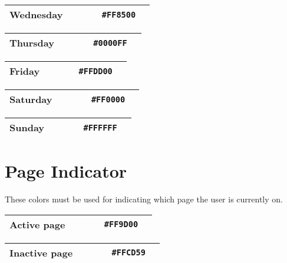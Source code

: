 \begin{table}[!htbp]
	\begin{tabularx}{\textwidth}{X r c r c}
		Wednesday 
		& ~ & ~
		& \texttt{\#FF8500} & \cellcolor[HTML]{FF8500}\phantom{--} \\ \hline
	\end{tabularx}
\end{table}

\begin{table}[!htbp]
	\begin{tabularx}{\textwidth}{X r c r c}
		Thursday 
		& ~ & ~
		& \texttt{\#0000FF} & \cellcolor[HTML]{0000FF}\phantom{--} \\ \hline
	\end{tabularx}
\end{table}

\begin{table}[!htbp]
	\begin{tabularx}{\textwidth}{X r c r c}
		Friday 
		& ~ & ~
		& \texttt{\#FFDD00} & \cellcolor[HTML]{FFDD00}\phantom{--} \\ \hline
	\end{tabularx}
\end{table}

\begin{table}[!htbp]
	\begin{tabularx}{\textwidth}{X r c r c}
		Saturday 
		& ~ & ~
		& \texttt{\#FF0000} & \cellcolor[HTML]{FF0000}\phantom{--} \\ \hline
	\end{tabularx}
\end{table}

\begin{table}[!htbp]
	\begin{tabularx}{\textwidth}{X r c r c}
		Sunday 
		& ~ & ~
		& \texttt{\#FFFFFF} & \cellcolor[HTML]{FFFFFF}\phantom{--} \\ \hline
	\end{tabularx}
\end{table}

\section{Page Indicator}
These colors must be used for indicating which page the user is currently on.

\begin{table}[!htbp]
	\begin{tabularx}{\textwidth}{X r c r c}
		Active page
		& ~ & ~
		& \texttt{\#FF9D00} & \cellcolor[HTML]{FF9D00}\phantom{--} \\ \hline
	\end{tabularx}
\end{table}

\begin{table}[!htbp]
	\begin{tabularx}{\textwidth}{X r c r c}
		Inactive page 
		& ~ & ~
		& \texttt{\#FFCD59} & \cellcolor[HTML]{FFCD59}\phantom{--} \\ \hline
	\end{tabularx}
\end{table}